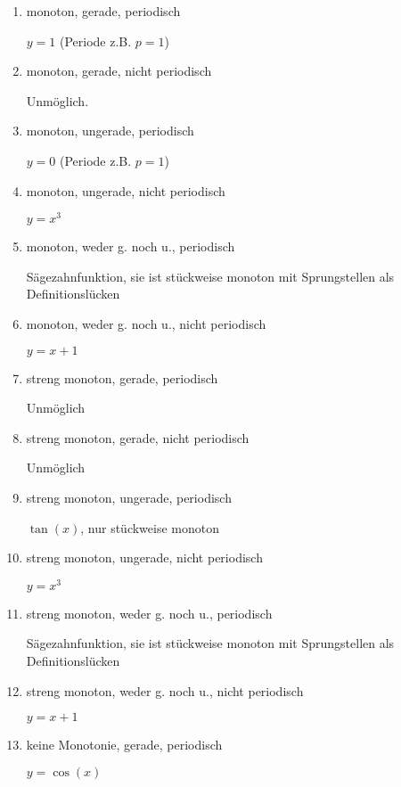 \item

\begin{enumerate}
\item monoton, gerade, periodisch

$y=1$ (Periode z.B. $p=1$)

\item monoton, gerade, nicht periodisch

Unmöglich. 

\item monoton, ungerade, periodisch

$y=0$ (Periode z.B. $p=1$)

\item monoton, ungerade, nicht periodisch

$y=x^3$ 
\item monoton, weder g. noch u., periodisch

Sägezahnfunktion, sie ist stückweise monoton mit Sprungstellen als Definitionslücken

\item monoton, weder g. noch u., nicht periodisch

$y=x+1$

\item streng monoton, gerade, periodisch

Unmöglich

\item streng monoton, gerade, nicht periodisch

Unmöglich

\item streng monoton, ungerade, periodisch

$\tan(x)$, nur stückweise monoton

\item streng monoton, ungerade, nicht periodisch

$y=x^3$ 

\item streng monoton, weder g. noch u., periodisch

Sägezahnfunktion, sie ist stückweise monoton mit Sprungstellen als Definitionslücken

\item streng monoton, weder g. noch u., nicht periodisch

$y=x+1$

\item keine Monotonie, gerade, periodisch

$y=\cos(x)$ 


\end{enumerate}

